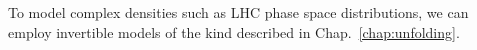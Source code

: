 To model complex densities such as LHC phase space distributions, we
can employ invertible models of the kind described in Chap.~\ref{chap:unfolding}. 




